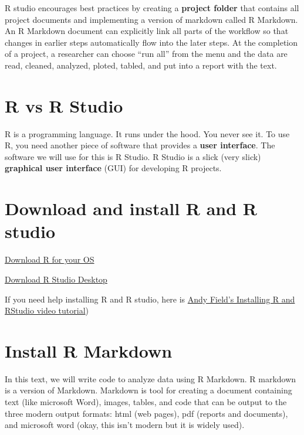 \documentclass[]{book}
\begin{document}
R studio encourages best practices by creating a \textbf{project folder} that contains all project documents and implementing a version of markdown called R Markdown. An R Markdown document can explicitly link all parts of the workflow so that changes in earlier steps automatically flow into the later steps. At the completion of a project, a researcher can choose ``run all'' from the menu and the data are read, cleaned, analyzed, ploted, tabled, and put into a report with the text.

\hypertarget{r-vs-r-studio}{%
\section{R vs R Studio}\label{r-vs-r-studio}}

R is a programming language. It runs under the hood. You never see it. To use R, you need another piece of software that provides a \textbf{user interface}. The software we will use for this is R Studio. R Studio is a slick (very slick) \textbf{graphical user interface} (GUI) for developing R projects.

\hypertarget{download-and-install-r-and-r-studio}{%
\section{Download and install R and R studio}\label{download-and-install-r-and-r-studio}}

\href{https://cran.r-project.org}{Download R for your OS}

\href{https://www.rstudio.com/products/rstudio/download/}{Download R Studio Desktop}

If you need help installing R and R studio, here is \href{https://www.youtube.com/watch?v=ZvPFKfNHBNQ}{Andy Field's Installing R and RStudio video tutorial})

\hypertarget{install-r-markdown}{%
\section{Install R Markdown}\label{install-r-markdown}}

In this text, we will write code to analyze data using R Markdown. R markdown is a version of Markdown. Markdown is tool for creating a document containing text (like microsoft Word), images, tables, and code that can be output to the three modern output formats: html (web pages), pdf (reports and documents), and microsoft word (okay, this isn't modern but it is widely used).
\end{document}
